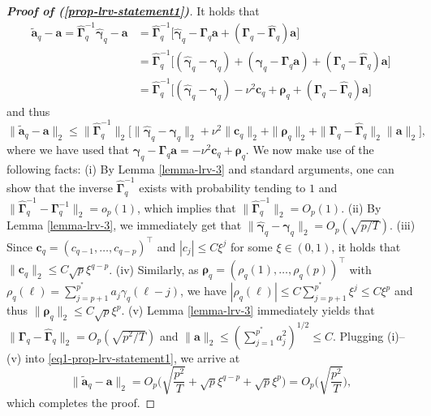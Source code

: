 \begin{proof}[\textnormal{\textbf{Proof of (\ref{prop-lrv-statement1})}}] It holds that   
\begin{align*}
\widetilde{\boldsymbol{a}}_q - \boldsymbol{a} = \widehat{\boldsymbol{\Gamma}}_q^{-1} \widehat{\boldsymbol{\gamma}}_q - \boldsymbol{a}   
 & = \widehat{\boldsymbol{\Gamma}}_q^{-1} \big[ \widehat{\boldsymbol{\gamma}}_q - \boldsymbol{\Gamma}_q \boldsymbol{a} + ( \boldsymbol{\Gamma}_q - \widehat{\boldsymbol{\Gamma}}_q )\boldsymbol{a} \big] \\
 & = \widehat{\boldsymbol{\Gamma}}_q^{-1} \big[ (\widehat{\boldsymbol{\gamma}}_q - \boldsymbol{\gamma}_q) + (\boldsymbol{\gamma}_q - \boldsymbol{\Gamma}_q \boldsymbol{a}) + (\boldsymbol{\Gamma}_q - \widehat{\boldsymbol{\Gamma}}_q)\boldsymbol{a} \big] \\
 & = \widehat{\boldsymbol{\Gamma}}_q^{-1} \big[ (\widehat{\boldsymbol{\gamma}}_q - \boldsymbol{\gamma}_q) - \nu^2 \boldsymbol{c}_q + \boldsymbol{\rho}_q  + (\boldsymbol{\Gamma}_q - \widehat{\boldsymbol{\Gamma}}_q)\boldsymbol{a} \big] 
\end{align*}
and thus 
\begin{equation}\label{eq1-prop-lrv-statement1}
\| \widetilde{\boldsymbol{a}}_q - \boldsymbol{a} \|_2 \le \| \widehat{\boldsymbol{\Gamma}}_q^{-1} \|_2 \Big[ \| \widehat{\boldsymbol{\gamma}}_q - \boldsymbol{\gamma}_q \|_2 + \nu^2 \| \boldsymbol{c}_q \|_2 + \| \boldsymbol{\rho}_q \|_2 + \| \boldsymbol{\Gamma}_q - \widehat{\boldsymbol{\Gamma}}_q \|_2 \| \boldsymbol{a} \|_2 \Big], 
\end{equation}
where we have used that $\boldsymbol{\gamma}_q - \boldsymbol{\Gamma}_q \boldsymbol{a} = -\nu^2 \boldsymbol{c}_q + \boldsymbol{\rho}_q$. We now make use of the following facts: (i) By Lemma \ref{lemma-lrv-3} and standard arguments, one can show that the inverse $\widehat{\boldsymbol{\Gamma}}_q^{-1}$ exists with probability tending to $1$ and $\| \widehat{\boldsymbol{\Gamma}}_q^{-1}  - \boldsymbol{\Gamma}_q^{-1} \|_2 = o_p(1)$, which implies that $\| \widehat{\boldsymbol{\Gamma}}_q^{-1} \|_2 = O_p(1)$. (ii) By Lemma \ref{lemma-lrv-3}, we immediately get that $\| \widehat{\boldsymbol{\gamma}}_q - \boldsymbol{\gamma}_q \|_2 = O_p(\sqrt{p/T})$. (iii) Since $\boldsymbol{c}_q = (c_{q-1},\ldots,c_{q-p})^\top$ and $|c_j| \le C \xi^j$ for some $\xi \in (0,1)$, it holds that $\| \boldsymbol{c}_q \|_2 \le C \sqrt{p} \xi^{q-p}$. (iv) Similarly, as $\boldsymbol{\rho}_q = (\rho_q(1),\ldots,\rho_q(p))^\top$ with $\rho_q(\ell) = \sum_{j=p+1}^{p^*} a_j \gamma_q(\ell-j)$, we have $|\rho_q(\ell)| \le C \sum_{j=p+1}^{p^*} \xi^j \le C \xi^p$ and thus $\| \boldsymbol{\rho}_q \|_2 \le C \sqrt{p} \xi^p$. (v) Lemma \ref{lemma-lrv-3} immediately yields that $\| \boldsymbol{\Gamma}_q - \widehat{\boldsymbol{\Gamma}}_q \|_2 = O_p(\sqrt{p^2/T})$ and $\| \boldsymbol{a} \|_2 \le ( \sum_{j=1}^{p^*} a_j^2 )^{1/2} \le C$. Plugging (i)--(v) into \eqref{eq1-prop-lrv-statement1}, we arrive at 
\[ \| \widetilde{\boldsymbol{a}}_q - \boldsymbol{a} \|_2 = O_p \Big( \sqrt{\frac{p^2}{T}} + \sqrt{p} \xi^{q-p} + \sqrt{p} \xi^p \Big) = O_p\Big(\sqrt{\frac{p^2}{T}}\Big), \]
which completes the proof.
\end{proof}


